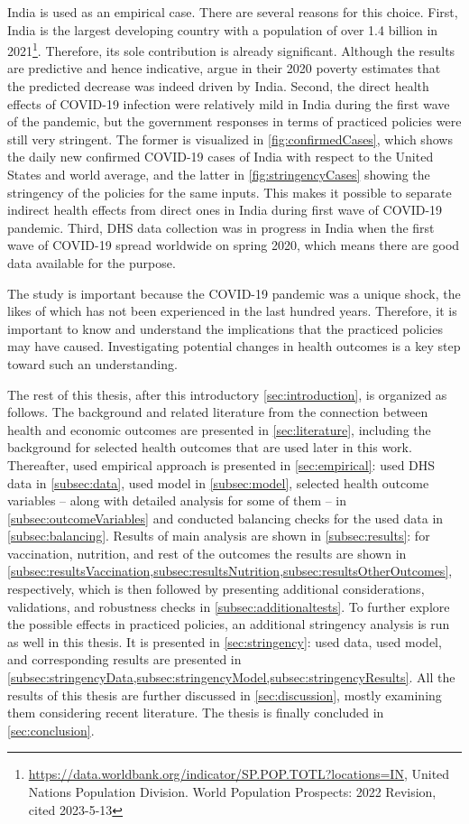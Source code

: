 \documentclass[12pt,a4paper,notitlepage]{article}
\begin{document}
India is used as an empirical case. There are several reasons for this choice. First, India is the largest developing country with a population of over 1.4 billion in 2021\footnote{\url{https://data.worldbank.org/indicator/SP.POP.TOTL?locations=IN}, United Nations Population Division. World Population Prospects: 2022 Revision, cited 2023-5-13}. Therefore, its sole contribution is already significant. Although the results are predictive and hence indicative, \citet{Lakmer:2022} argue in their 2020 poverty estimates that the predicted decrease was indeed driven by India. Second, the direct health effects of COVID-19 infection were relatively mild in India during the first wave of the pandemic, but the government responses in terms of practiced policies were still very stringent. The former is visualized in \cref{fig:confirmedCases}, which shows the daily new confirmed COVID-19 cases of India with respect to the United States and world average, and the latter in \cref{fig:stringencyCases} showing the stringency of the policies for the same inputs. This makes it possible to separate indirect health effects from direct ones in India during first wave of COVID-19 pandemic. Third, DHS data collection was in progress in India when the first wave of COVID-19 spread worldwide on spring 2020, which means there are good data available for the purpose.

The study is important because the COVID-19 pandemic was a unique shock, the likes of which has not been experienced in the last hundred years. Therefore, it is important to know and understand the implications that the practiced policies may have caused. Investigating potential changes in health outcomes is a key step toward such an understanding.

The rest of this thesis, after this introductory \cref{sec:introduction}, is organized as follows. The background and related literature from the connection between health and economic outcomes are presented in \cref{sec:literature}, including the background for selected health outcomes that are used later in this work. Thereafter, used empirical approach is presented in \cref{sec:empirical}: used DHS data in \cref{subsec:data}, used model in \cref{subsec:model}, selected health outcome variables -- along with detailed analysis for some of them -- in \cref{subsec:outcomeVariables} and conducted balancing checks for the used data in \cref{subsec:balancing}. Results of main analysis are shown in \cref{subsec:results}: for vaccination, nutrition, and rest of the outcomes the results are shown in \cref{subsec:resultsVaccination,subsec:resultsNutrition,subsec:resultsOtherOutcomes}, respectively, which is then followed by presenting additional considerations, validations, and robustness checks in \cref{subsec:additionaltests}. To further explore the possible effects in practiced policies, an additional stringency analysis is run as well in this thesis. It is presented in \cref{sec:stringency}: used data, used model, and corresponding results are presented in \cref{subsec:stringencyData,subsec:stringencyModel,subsec:stringencyResults}. All the results of this thesis are further discussed in \cref{sec:discussion}, mostly examining them considering recent literature. The thesis is finally concluded in \cref{sec:conclusion}.
\end{document}
